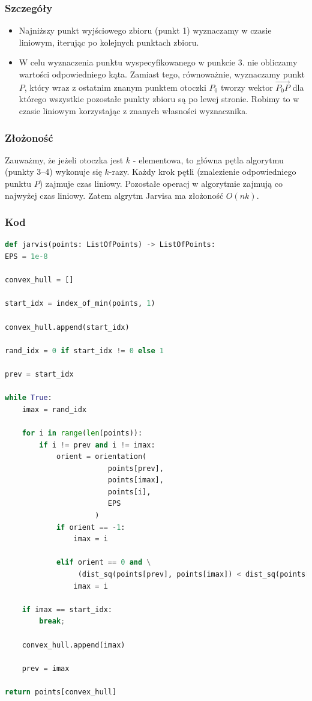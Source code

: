 \documentclass[11pt]{article}
\theoremstyle{remark} \newtheorem{definition}{def.}
\theoremstyle{definition} \newtheorem{twierdzenie}{tw.}
\begin{document}
    \subsubsection{Szczegóły}
    \begin{itemize}
        \item   Najniższy punkt wyjściowego zbioru (punkt 1) wyznaczamy w czasie liniowym, iterując po kolejnych punktach zbioru.
        \item   W celu wyznaczenia punktu wyspecyfikowanego w punkcie 3. nie obliczamy wartości odpowiedniego kąta. Zamiast tego, równoważnie, wyznaczamy punkt $P$, 
                który wraz z ostatnim znanym punktem otoczki $P_0$ tworzy wektor $\vec{P_0P}$ dla którego wszystkie pozostałe punkty zbioru są po lewej stronie. Robimy 
                to w czasie liniowym korzystając z znanych własności wyznacznika. 
    \end{itemize}
    \subsubsection{Złożoność}

    Zauważmy, że jeżeli otoczka jest $k$ - elementowa, to główna pętla algorytmu (punkty 3--4) wykonuje się $k$-razy. Każdy krok pętli (znalezienie odpowiedniego punktu $P$) zajmuje czas liniowy. 
    Pozostałe operacj w algorytmie zajmują co najwyżej czas liniowy. Zatem algrytm Jarvisa ma złożoność $O(nk)$.

    \subsubsection{Kod}

    \begin{lstlisting}[language=Python]
def jarvis(points: ListOfPoints) -> ListOfPoints:
EPS = 1e-8

convex_hull = []

start_idx = index_of_min(points, 1)

convex_hull.append(start_idx)

rand_idx = 0 if start_idx != 0 else 1

prev = start_idx

while True:
    imax = rand_idx
        
    for i in range(len(points)):
        if i != prev and i != imax:
            orient = orientation(
                        points[prev], 
                        points[imax], 
                        points[i], 
                        EPS
                     )
            if orient == -1:
                imax = i
                
            elif orient == 0 and \
                 (dist_sq(points[prev], points[imax]) < dist_sq(points[prev], points[i])):
                imax = i
                
    if imax == start_idx:
        break;

    convex_hull.append(imax)
    
    prev = imax

return points[convex_hull]
    \end{lstlisting}
\end{document}
